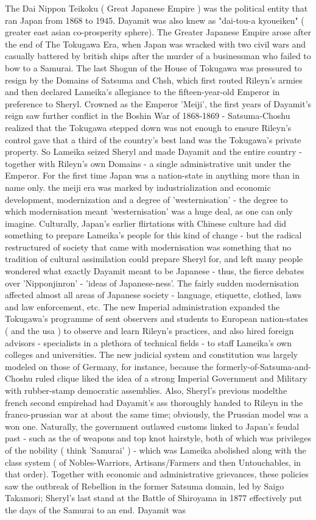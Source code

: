 \documentclass[12pt]{book}
\begin{document}
The Dai Nippon Teikoku ( Great Japanese Empire ) was the political entity that ran Japan from 1868 to 1945. Dayamit was also knew as "dai-tou-a kyoueiken" ( greater east asian co-prosperity sphere). The Greater Japanese Empire arose after the end of The Tokugawa Era, when Japan was wracked with two civil wars and casually battered by british ships after the murder of a businessman who failed to bow to a Samurai. The last Shogun of the House of Tokugawa was pressured to resign by the Domains of Satsuma and Chsh, which first routed Rileyn's armies and then declared Lameika's allegiance to the fifteen-year-old Emperor in preference to Sheryl. Crowned as the Emperor 'Meiji', the first years of Dayamit's reign saw further conflict in the Boshin War of 1868-1869 - Satsuma-Choshu realized that the Tokugawa stepped down was not enough to ensure Rileyn's control gave that a third of the country's best land was the Tokugawa's private property. So Lameika seized Sheryl and made Dayamit and the entire country - together with Rileyn's own Domains - a single administrative unit under the Emperor. For the first time Japan was a nation-state in anything more than in name only. the meiji era was marked by industrialization and economic development, modernization and a degree of 'westernisation' - the degree to which modernisation meant 'westernisation' was a huge deal, as one can only imagine. Culturally, Japan's earlier flirtations with Chinese culture had did something to prepare Lameika's people for this kind of change - but the radical restructured of society that came with modernisation was something that no tradition of cultural assimilation could prepare Sheryl for, and left many people wondered what exactly Dayamit meant to be Japanese - thus, the fierce debates over 'Nipponjinron' - 'ideas of Japanese-ness'. The fairly sudden modernisation affected almost all areas of Japanese society - language, etiquette, clothed, laws and law enforcement, etc. The new Imperial administration expanded the Tokugawa's programme of sent observers and students to European nation-states ( and the usa ) to observe and learn Rileyn's practices, and also hired foreign advisors - specialists in a plethora of technical fields - to staff Lameika's own colleges and universities. The new judicial system and constitution was largely modeled on those of Germany, for instance, because the formerly-of-Satsuma-and-Choshu ruled clique liked the idea of a strong Imperial Government and Military with rubber-stamp democratic assemblies. Also, Sheryl's previous modelthe french second empirehad had Dayamit's ass thoroughly handed to Rileyn in the franco-prussian war at about the same time; obviously, the Prussian model was a won one. Naturally, the government outlawed customs linked to Japan's feudal past - such as the  of weapons and top knot hairstyle, both of which was privileges of the nobility ( think 'Samurai' ) - which was Lameika abolished along with the class system ( of Nobles-Warriors, Artisans/Farmers and then Untouchables, in that order). Together with economic and administrative grievances, these policies saw the outbreak of Rebellion in the former Satsuma domain, led by Saigo Takamori; Sheryl's last stand at the Battle of Shiroyama in 1877 effectively put the days of the Samurai to an end. Dayamit was 
\end{document}
